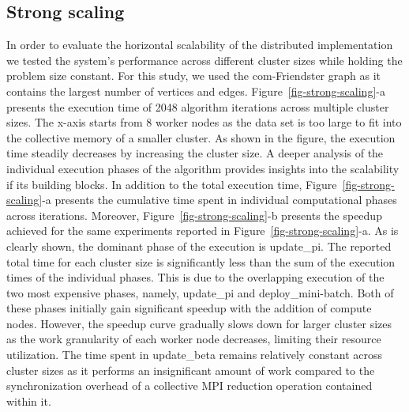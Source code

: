 \subsection{Strong scaling}

\begin{figure*}[t] %
  \centering
  \caption{(a) Execution time of 2048 algorithm iterations for the
  same problem size (com-Friendster, K=1024, M=16384 n=32) across different
  cluster sizes. (b) Speedup achieved for same experiments in (a) with respect to
  8-nodes}
  \label{fig-strong-scaling}
\end{figure*}

In order to evaluate the horizontal scalability of the distributed
implementation we tested the system's performance across different cluster
sizes while holding the problem size constant. For this study, we used the
com-Friendster graph as it contains the largest number of vertices and edges.
%
Figure~\ref{fig-strong-scaling}-a presents the execution time of 2048 algorithm
iterations across multiple cluster sizes. The x-axis starts from 8 worker nodes
as the data set is too large to fit into the collective memory of a smaller
cluster.
%
As shown in the figure, the execution
time steadily decreases by increasing the cluster size.
A deeper analysis of the individual execution phases of the algorithm provides
insights into the scalability if its building blocks.
%
In addition to the total execution time, Figure~\ref{fig-strong-scaling}-a
presents the cumulative time spent in individual computational phases across
iterations. Moreover, Figure~\ref{fig-strong-scaling}-b presents the speedup
achieved for the same experiments reported in
Figure~\ref{fig-strong-scaling}-a. As is clearly shown, the dominant phase of
the execution is update\_pi.
The reported total time for each cluster size is significantly less than the
sum of the execution times of the individual phases. This is due to the
overlapping execution of the two most expensive phases, namely, update\_pi and
deploy\_mini-batch. Both of these phases initially gain significant speedup with the
addition of compute nodes. However, the speedup curve gradually slows down for
larger cluster sizes as the work granularity of each worker node decreases,
limiting their resource utilization.
%
The time spent in update\_beta remains relatively constant across cluster sizes
as it performs an insignificant amount of work compared to the synchronization
overhead of a collective MPI reduction operation contained within it.

